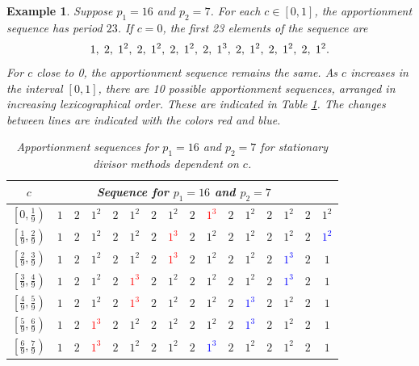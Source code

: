 \documentclass[pdflatex,sn-mathphys-num]{sn-jnl}
\theoremstyle{thmstyleone}%
\theoremstyle{thmstyletwo}%
\newtheorem{example}{Example}%
\theoremstyle{thmstylethree}%
\begin{document}
 \begin{example}
 Suppose $p_1=16$ and $p_2=7$. For each $c \in [0, 1]$, the apportionment sequence has period $23$. If $c=0$, the first 23 elements of the sequence are
  $$1,  \hskip 1mm 2, \hskip 1mm 1^2, \hskip 1mm 2, \hskip 1mm 1^2, \hskip 1mm 2, \hskip 1mm 1^2, \hskip 1mm 2, \hskip 1mm 1^3, \hskip 1mm 2, \hskip 1mm 1^2, \hskip 1mm 2, \hskip 1mm 1^2, \hskip 1mm 2, \hskip 1mm 1^2.$$
For $c$ close to 0, the apportionment sequence remains the same. As $c$ increases in the interval $[0,1]$, there are 10 possible apportionment sequences, arranged in increasing lexicographical order. These are indicated in Table  \ref{first-sequential-example}. The changes between lines are indicated with the colors red and blue.

 
\begin{table}[tbh]
\caption{Apportionment sequences for $p_1 = 16$ and $p_2 = 7$ for stationary divisor methods dependent on $c$.}
\label{first-sequential-example}
\renewcommand{\arraystretch}{1.2}
\setlength{\tabcolsep}{2pt}
\begin{tabular}{c|*{15}c}
$c$ & \multicolumn{14}{c}{Sequence for $p_1 = 16$ and $p_2 = 7$}  \\
\hline
$\left[ 0, \frac{1}{9} \right)$ & $1$ & $2$ & $1^2$ & $2$ & $1^2$ & $2$ & $1^2$ & $2$ & \textcolor{red}{$1^3$} & $2$ & $1^2$ & $2$ & $1^2$ & $2$ & $1^2$ \\
$\left[ \frac{1}{9}, \frac{2}{9} \right)$ & $1$ & $2$ & $1^2$ & $2$ & $1^2$ & $2$ & \textcolor{red}{$1^3$} & $2$ & $1^2$ & $2$ & $1^2$ & $2$ & $1^2$ & $2$ & \textcolor{blue}{$1^2$} \\
$\left[ \frac{2}{9}, \frac{3}{9} \right)$ & $1$ & $2$ & $1^2$ & $2$ & $1^2$ & $2$ & \textcolor{red}{$1^3$} & $2$ & $1^2$ & $2$ & $1^2$ & $2$ & \textcolor{blue}{$1^3$} & $2$ & $1$ \\
$\left[ \frac{3}{9}, \frac{4}{9} \right)$ & $1$ & $2$ & $1^2$ & $2$ & \textcolor{red}{$1^3$} & $2$ & $1^2$ & $2$ & $1^2$ & $2$ & $1^2$ & $2$ & \textcolor{blue}{$1^3$} & $2$ & $1$ \\ 
$\left[ \frac{4}{9}, \frac{5}{9} \right)$ & $1$ & $2$ & $1^2$ & $2$ & \textcolor{red}{$1^3$} & $2$ & $1^2$ & $2$ & $1^2$ & $2$ & \textcolor{blue}{$1^3$} & $2$ & $1^2$ & $2$ & $1$ \\ 
$\left[ \frac{5}{9}, \frac{6}{9} \right)$ & $1$ & $2$ & \textcolor{red}{$1^3$} & $2$ & $1^2$ & $2$ & $1^2$ & $2$ & $1^2$ & $2$ & \textcolor{blue}{$1^3$} & $2$ & $1^2$ & $2$ & $1$ \\
$\left[ \frac{6}{9}, \frac{7}{9} \right)$ & $1$ & $2$ & \textcolor{red}{$1^3$} & $2$ & $1^2$ & $2$ & $1^2$ & $2$ & \textcolor{blue}{$1^3$} & $2$ & $1^2$ & $2$ & $1^2$ & $2$ & $1$ \\

\end{tabular}
\end{table}
\end{example}
\end{document}

